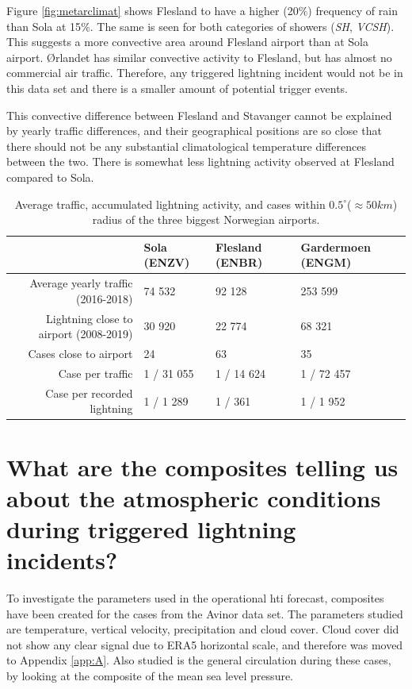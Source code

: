 Figure \ref{fig:metarclimat} shows Flesland to have a higher (20$\%$) frequency of rain than Sola at 15$\%$. The same is seen for both categories of showers (\textit{SH}, \textit{VCSH}). This suggests a more convective area around Flesland airport than at Sola airport. Ørlandet has similar convective activity to Flesland, but has almost no commercial air traffic. Therefore, any triggered lightning incident would not be in this data set and there is a smaller amount of potential trigger events. 

This convective difference between Flesland and Stavanger cannot be explained by yearly traffic differences, and their geographical positions are so close that there should not be any substantial climatological temperature differences between the two. There is somewhat less lightning activity observed at Flesland compared to Sola.

\begin{table}
        \begin{tabular}{r|l|l|l|}
            & Sola (ENZV) & Flesland (ENBR) & Gardermoen (ENGM) \\\hline
            Average yearly traffic (2016-2018)  & 74 532 & 92 128 & 253 599   \\\hline
            Lightning close to airport (2008-2019) & 30 920 & 22 774 & 68 321 \\\hline
            Cases close to airport & 24 & 63  & 35 \\\hline
            Case per traffic  & 1 / 31 055 & 1 / 14 624 & 1 / 72 457 \\\hline
            Case per recorded lightning & 1 / 1 289 & 1 / 361 & 1 / 1 952 \\\hline
        \end{tabular}
     \caption{Average traffic, accumulated lightning activity, and cases within $0.5^{\circ}$($\approx 50km$) radius of the three biggest Norwegian airports.}
     \label{tab:traffic}
\end{table}



\section{What are the composites telling us about the atmospheric conditions during triggered lightning incidents?}\label{sec:compositesera5}
To investigate the parameters used in the operational \acrshort{hti} forecast, composites have been created for the cases from the Avinor data set. The parameters studied are temperature, vertical velocity, precipitation and cloud cover. Cloud cover did not show any clear signal due to ERA5 horizontal scale, and therefore was moved to Appendix \ref{app:A}. Also studied is the general circulation during these cases, by looking at the composite of the mean sea level pressure. 

